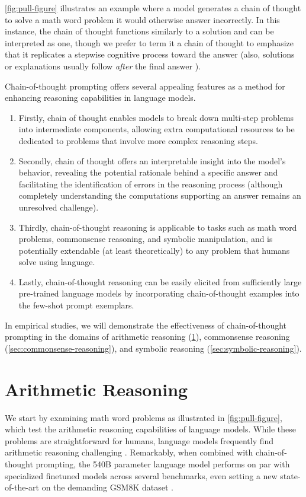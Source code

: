 \cref{fig:pull-figure} illustrates an example where a model generates a chain of thought to solve a math word problem it would otherwise answer incorrectly. In this instance, the chain of thought functions similarly to a solution and can be interpreted as one, though we prefer to term it a chain of thought to emphasize that it replicates a stepwise cognitive process toward the answer (also, solutions or explanations usually follow \textit{after} the final answer \citep[][\textit{inter alia}]{narang2020wt5,wiegreffe2021reframing,lampinen2022can}).

Chain-of-thought prompting offers several appealing features as a method for enhancing reasoning capabilities in language models.

\begin{enumerate}[topsep=1pt,itemsep=0ex]
    \item Firstly, chain of thought enables models to break down multi-step problems into intermediate components, allowing extra computational resources to be dedicated to problems that involve more complex reasoning steps.
    \item Secondly, chain of thought offers an interpretable insight into the model’s behavior, revealing the potential rationale behind a specific answer and facilitating the identification of errors in the reasoning process (although completely understanding the computations supporting an answer remains an unresolved challenge).
    \item Thirdly, chain-of-thought reasoning is applicable to tasks such as math word problems, commonsense reasoning, and symbolic manipulation, and is potentially extendable (at least theoretically) to any problem that humans solve using language.
    \item Lastly, chain-of-thought reasoning can be easily elicited from sufficiently large pre-trained language models by incorporating chain-of-thought examples into the few-shot prompt exemplars.
\end{enumerate}

In empirical studies, we will demonstrate the effectiveness of chain-of-thought prompting in the domains of arithmetic reasoning (\cref{sec:arithmetic-reasoning}), commonsense reasoning (\cref{sec:commonsense-reasoning}), and symbolic reasoning (\cref{sec:symbolic-reasoning}).

\section{Arithmetic Reasoning}\label{sec:arithmetic-reasoning}
We start by examining math word problems as illustrated in \cref{fig:pull-figure}, which test the arithmetic reasoning capabilities of language models. While these problems are straightforward for humans, language models frequently find arithmetic reasoning challenging \citep[][\textit{inter alia}]{hendrycks2021measuring,patel-etal-2021-nlp}. Remarkably, when combined with chain-of-thought prompting, the 540B parameter language model performs on par with specialized finetuned models across several benchmarks, even setting a new state-of-the-art on the demanding GSM8K dataset \citep{cobbe2021training}.

